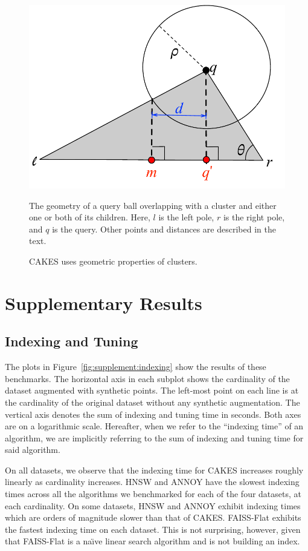 \documentclass[review,supplement,onefignum,onetabnum]{siamonline220329}
\begin{document}
\begin{figure}
    \centering
    \includegraphics[scale=0.75]{images/geometry/overlapping-children-3.pdf}
    \caption{The geometry of a query ball overlapping with a cluster and either one or both of its children. Here, $l$ is the left pole, $r$ is the right pole, and $q$ is the query. Other points and distances are described in the text.}
    \label{fig:supplement:overlapping-children}
    \caption{CAKES uses geometric properties of clusters.}
\end{figure}


\section{Supplementary Results}

\subsection{Indexing and Tuning}

The plots in Figure~\ref{fig:supplement:indexing} show the results of these benchmarks.
The horizontal axis in each subplot shows the cardinality of the dataset augmented with synthetic points.
The left-most point on each line is at the cardinality of the original dataset without any synthetic augmentation.
The vertical axis denotes the sum of indexing and tuning time in seconds.
Both axes are on a logarithmic scale.
Hereafter, when we refer to the ``indexing time'' of an algorithm, we are implicitly referring to the sum of indexing and tuning time for said algorithm.

On all datasets, we observe that the indexing time for CAKES increases roughly linearly as cardinality increases.
HNSW and ANNOY have the slowest indexing times across all the algorithms we benchmarked for each of the four datasets, at each cardinality.
On some datasets, HNSW and ANNOY exhibit indexing times which are orders of magnitude slower than that of CAKES.
FAISS-Flat exhibits the fastest indexing time on each dataset.
This is not surprising, however, given that FAISS-Flat is a na\"{\i}ve linear search algorithm and is not building an index.
\end{document}
